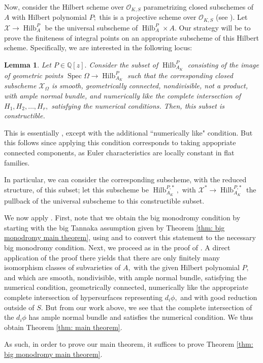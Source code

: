\documentclass{article}
\newtheorem{lemma}[thm]{Lemma}
\theoremstyle{definition}
\theoremstyle{remark}
\DeclareMathOperator{\Spec}{Spec}
\DeclareMathOperator{\Hilb}{Hilb}
\begin{document}
\par Now, consider the Hilbert scheme over $\mathcal{O}_{K, S}$ parametrizing closed subschemes of $A$ with Hilbert polynomial $P;$ this is a projective scheme over $\mathcal{O}_{K, S}$ (see \cite[Theorem 3.2, p.221-12]{fga}). Let $\mathcal{X} \rightarrow \Hilb_A^P$ be the universal subscheme of $\Hilb_A^P \times A.$ Our strategy will be to prove the finiteness of integral points on an appropriate subscheme of this Hilbert scheme. Specifically, we are interested in the following locus:
\begin{lemma}\label{lem: the locus we want}
Let $P \in \mathbb{Q}[z].$ Consider the subset of $\Hilb_{A_K}^P$ consisting of the image of geometric points $\Spec \Omega \rightarrow \Hilb_{A_K}^P$ such that the corresponding closed subscheme $\mathcal{X}_{\Omega}$ is smooth, geometrically connected, nondivisible, not a product, with ample normal bundle, and numerically like the complete intersection of $H_1, H_2, \ldots, H_r,$ satisfying the numerical conditions. Then, this subset is constructible. 
\end{lemma}
\par This is essentially \cite[Lemma 2.1]{km24}, except with the additional ``numerically like" condition. But this follows since applying this condition corresponds to taking appopriate connected components, as Euler characteristics are locally constant in flat families.
\par In particular, we can consider the corresponding subscheme, with the reduced structure, of this subset; let this subscheme be $\Hilb_{A_K}^{P, *},$ with $\mathcal{X}^* \rightarrow \Hilb_{A_K}^{P, *}$ the pullback of the universal subscheme to this constructible subset.
\par We now apply \cite[Theorem D]{km24}. First, note that we obtain the big monodromy condition by starting with the big Tannaka assumption given by Theorem \ref{thm: big monodromy main theorem}, using \cite[Theorem 4.10]{jklm23} and \cite[Theorem 6.1]{jklm23} to convert this statement to the necessary big monodromy condition. Next, we proceed as in the proof of \cite[Theorem 2.3]{km24}. A direct application of the proof there yields that there are only finitely many isomorphism classes of subvarieties of $A,$ with the given Hilbert polynomial $P,$ and which are smooth, nondivisible, with ample normal bundle, satisfying the numerical condition, geometrically connected, numerically like the appropriate complete intersection of hypersurfaces representing $d_i\phi,$ and with good reduction outside of $S.$ But from our work above, we see that the complete intersection of the $d_i \phi$ has ample normal bundle and satisfies the numerical condition. We thus obtain Theorem \ref{thm: main theorem}.
\par As such, in order to prove our main theorem, it suffices to prove Theorem \ref{thm: big monodromy main theorem}. 
\end{document}
